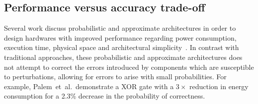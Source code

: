 \documentclass[a4paper,12pt]{article}
\newcommand{\etal}{et~al.}
\begin{document}


\subsection{Performance versus accuracy trade-off}
\label{subsec:perfvsacc}

Several work discuss probabilistic and approximate architectures in order to
design hardwares with improved performance regarding power consumption,
execution time, physical space and architectural simplicity~\cite{palem09,palem12,lingamneni12,kirsch12}.
In contrast with traditional approaches, these probabilistic and approximate architectures does not attempt to correct
the errors introduced by components which are susceptible to perturbations, allowing for errors to arise with small 
probabilities. For example, Palem~\etal~demonstrate a XOR gate with a
$3\times$ reduction in energy consumption for a 2.3\% decrease in the
probability of correctness.

\end{document}
